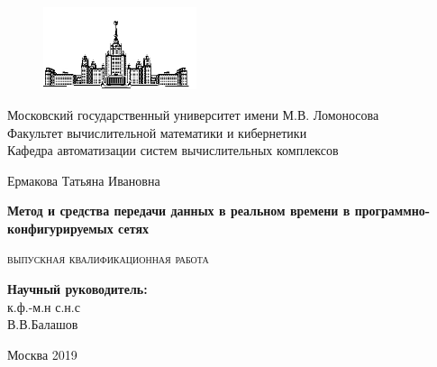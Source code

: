 \documentclass[12pt,fleqn]{article}
\begin{document}
\sloppy
	
\begin{titlepage}
\newpage
		
\begin{figure}[t]
	\centering
	\includegraphics[width=0.4\textwidth]{img/mgu}
\end{figure}
		
\begin{center}
Московский государственный университет имени М.В. Ломоносова \\
Факультет вычислительной математики и кибернетики \\
Кафедра автоматизации систем вычислительных комплексов \\
\end{center}
		
\vspace{6em}
\begin{center}
\large
Ермакова Татьяна Ивановна
\end{center}
		
\begin{center}
\Large
\bfseries
Метод и средства передачи данных в реальном времени в программно-конфигурируемых сетях
\end{center}

\begin{center}
\large
\textsc{
	выпускная квалификационная работа
}
\end{center}

\vspace{4em}
\begin{flushright}
	\textbf{Научный руководитель:}\\
	к.ф.-м.н с.н.с\\
	В.В.Балашов\\
\end{flushright}%


\vspace{\fill}
\begin{center}
Москва 2019
\end{center}
		
\end{titlepage}


\renewcommand{\contentsname}{Содержание}
\tableofcontents
\end{document}
